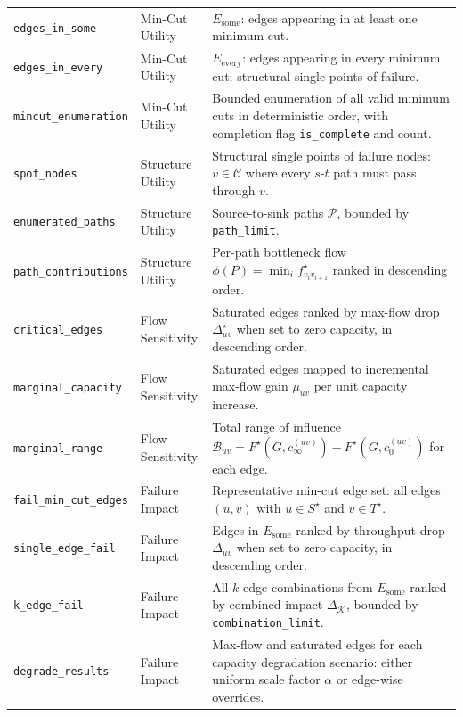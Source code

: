 \documentclass[12pt]{report}
\begin{document}
\begin{longtable}{>{\raggedright\arraybackslash}p{4cm} >{\raggedright\arraybackslash}p{2.5cm} p{7.5cm}}
\texttt{edges\_in\_some} & Min-Cut Utility & $E_{\text{some}}$: edges appearing in at least one minimum cut. \\[2pt]
\texttt{edges\_in\_every} & Min-Cut Utility & $E_{\text{every}}$: edges appearing in every minimum cut; structural single points of failure. \\[2pt]
\texttt{mincut\_enumeration} & Min-Cut Utility & Bounded enumeration of all valid minimum cuts in deterministic order, with completion flag \texttt{is\_complete} and count. \\[2pt]
\midrule
\texttt{spof\_nodes} & Structure Utility & Structural single points of failure nodes: $v \in \mathcal{C}$ where every $s$-$t$ path must pass through $v$. \\[2pt]
\texttt{enumerated\_paths} & Structure Utility & Source-to-sink paths $\mathcal{P}$, bounded by \texttt{path\_limit}. \\[2pt]
\texttt{path\_contributions} & Structure Utility & Per-path bottleneck flow $\phi(P) = \min_i f^\star_{v_i v_{i+1}}$ ranked in descending order. \\[2pt]
\midrule
\texttt{critical\_edges} & Flow Sensitivity & Saturated edges ranked by max-flow drop $\Delta^\star_{uv}$ when set to zero capacity, in descending order. \\[2pt]
\texttt{marginal\_capacity} & Flow Sensitivity & Saturated edges mapped to incremental max-flow gain $\mu_{uv}$ per unit capacity increase. \\[2pt]
\texttt{marginal\_range} & Flow Sensitivity & Total range of influence $\mathcal{B}_{uv} = F^\star(G, c^{(uv)}_\infty) - F^\star(G, c^{(uv)}_0)$ for each edge. \\[2pt]
\midrule
\texttt{fail\_min\_cut\_edges} & Failure Impact & Representative min-cut edge set: all edges $(u,v)$ with $u \in S^\star$ and $v \in T^\star$. \\[2pt]
\texttt{single\_edge\_fail} & Failure Impact & Edges in $E_{\text{some}}$ ranked by throughput drop $\Delta_{uv}$ when set to zero capacity, in descending order. \\[2pt]
\texttt{k\_edge\_fail} & Failure Impact & All $k$-edge combinations from $E_{\text{some}}$ ranked by combined impact $\Delta_{\mathcal{K}}$, bounded by \texttt{combination\_limit}. \\[2pt]
\texttt{degrade\_results} & Failure Impact & Max-flow and saturated edges for each capacity degradation scenario: either uniform scale factor $\alpha$ or edge-wise overrides. \\[2pt]

\end{longtable}
\end{document}
